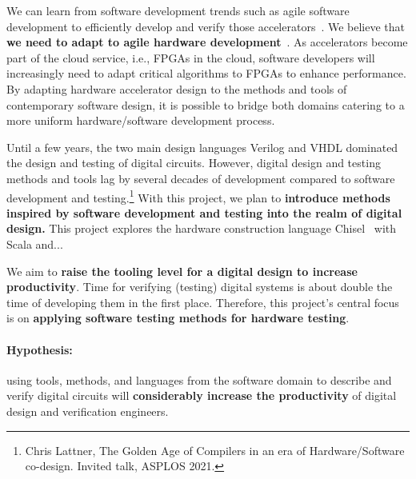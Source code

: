 \documentclass[fleqn,12pt]{article}
\begin{document}
We can learn from software development trends such as agile software development
to efficiently develop and verify those accelerators~\cite{agile:manifesto}.
We believe that {\bf we need to adapt to agile hardware development}~\cite{henn-patt:turing:2019}.
%
As accelerators become part of the cloud service, i.e., FPGAs in the cloud,
software developers will increasingly need to adapt critical algorithms to FPGAs to enhance performance.
By adapting hardware accelerator design to the methods and tools of contemporary software design,
it is possible to bridge both domains catering to a more uniform hardware/software development process.

Until a few years, the two main design languages Verilog and VHDL dominated the
design and testing of digital circuits.
However, digital design and testing methods and tools lag by several decades of development
compared to software development and testing.\footnote{Chris Lattner, The Golden Age of Compilers in an era of Hardware/Software co-design. Invited talk, ASPLOS 2021.}
With this project, we plan to
{\bf introduce methods inspired by software development and testing into the realm of digital design.}
This project explores the hardware construction language Chisel~\cite{chisel:dac2012} with Scala
and...

We aim to {\bf raise the tooling level for a digital design to increase productivity}.
Time for verifying (testing) digital systems is about double the time of developing
them in the first place.
Therefore, this project's central focus is on {\bf applying software
testing methods for hardware testing}.


\paragraph{Hypothesis:} using tools, methods, and languages from the
software domain to describe and verify digital circuits will {\bf considerably increase the productivity}
of digital design and verification engineers.
\end{document}
